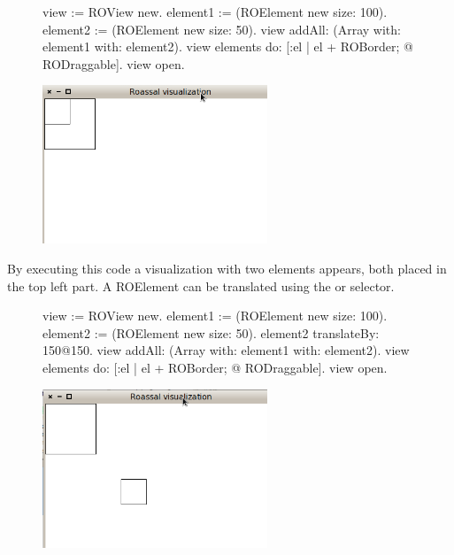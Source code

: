 \documentclass[a4paper,10pt,twoside]{book}
\begin{document}
\begin{figure}[H]
      \begin{minipage}[t]{0.5\textwidth}
      \vspace{0pt}
\begin{code}{}
view := ROView new.
element1 := (ROElement new size: 100).
element2 := (ROElement new size: 50).
view addAll: (Array with: element1 with: element2).
view elements do: [:el | el + ROBorder; @ RODraggable].
view open.
\end{code}
   \end{minipage}
   \hfill
   \begin{minipage}[t]{0.6\textwidth}
      \vspace{0pt} \raggedright
       \centering
		\includegraphics[width=0.6\textwidth]{ex3}
   \end{minipage}
\label{fig:ex3}
\end{figure}

By executing this code a visualization with two elements appears, both placed in the top left part. A ROElement can be translated using the  or  selector.

\begin{figure}[H]
      \begin{minipage}[t]{0.5\textwidth}
      \vspace{0pt}
\begin{code}{}
view := ROView new.
element1 := (ROElement new size: 100).
element2 := (ROElement new size: 50).
element2 translateBy: 150@150.
view addAll: (Array with: element1 with: element2).
view elements do: [:el | el + ROBorder; @ RODraggable].
view open.
\end{code}
   \end{minipage}
   \hfill
   \begin{minipage}[t]{0.6\textwidth}
      \vspace{0pt} \raggedright
       \centering
		\includegraphics[width=0.6\textwidth]{ex4}
   \end{minipage}
\label{fig:ex4}
\end{figure}
\end{document}

